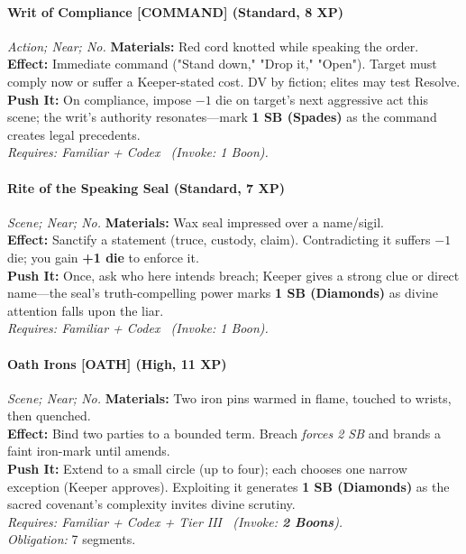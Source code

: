\paragraph{Writ of Compliance \textnormal{[COMMAND]} (Standard, 8 XP)} \emph{Action; Near; No.}
\textbf{Materials:} Red cord knotted while speaking the order.\\
\textbf{Effect:} Immediate command ("Stand down," "Drop it," "Open"). Target must comply now or suffer a Keeper-stated cost. DV by fiction; elites may test Resolve.\\
\textbf{Push It:} On compliance, impose \(-1\) die on target's next aggressive act this scene; the writ's authority resonates—mark \textbf{1 SB (Spades)} as the command creates legal precedents.\\
\emph{Requires: Familiar + Codex \ (\textit{Invoke:} 1 Boon).}

\paragraph{Rite of the Speaking Seal (Standard, 7 XP)} \emph{Scene; Near; No.}
\textbf{Materials:} Wax seal impressed over a name/sigil.\\
\textbf{Effect:} Sanctify a statement (truce, custody, claim). Contradicting it suffers \(-1\) die; you gain \textbf{+1 die} to enforce it.\\
\textbf{Push It:} Once, ask who here intends breach; Keeper gives a strong clue or direct name—the seal's truth-compelling power marks \textbf{1 SB (Diamonds)} as divine attention falls upon the liar.\\
\emph{Requires: Familiar + Codex \ (\textit{Invoke:} 1 Boon).}

\paragraph{Oath Irons \textnormal{[OATH]} (High, 11 XP)} \emph{Scene; Near; No.}
\textbf{Materials:} Two iron pins warmed in flame, touched to wrists, then quenched.\\
\textbf{Effect:} Bind two parties to a bounded term. Breach \emph{forces 2 SB} and brands a faint iron-mark until amends.\\
\textbf{Push It:} Extend to a small circle (up to four); each chooses one narrow exception (Keeper approves). Exploiting it generates \textbf{1 SB (Diamonds)} as the sacred covenant's complexity invites divine scrutiny.\\
\emph{Requires: Familiar + Codex + Tier III \ (\textit{Invoke:} \textbf{2 Boons}).}\\
\emph{Obligation:} 7 segments.